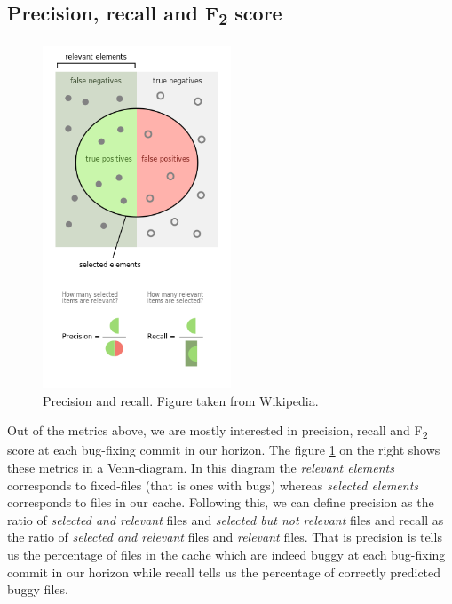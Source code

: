 \documentclass[12pt,twoside,notitlepage]{report}
\begin{document}
\subsection{Precision, recall and F\textsubscript{2} score}
\begin{figure}[ht!]
\includegraphics[width=0.5\textwidth]{Precisionrecall.png}
\centering
 \begin{minipage}{\linewidth}
    \caption[Precision and recall.]%
    {Precision and recall. Figure taken from Wikipedia\footnotemark.}
  \end{minipage}
  \label{precisionrecall}
\end{figure}
Out of the metrics above, we are mostly interested in precision, recall and F\textsubscript{2} score at each bug-fixing commit in our horizon. The figure \ref{precisionrecall} on the right shows these metrics in a Venn-diagram. In this diagram the \textit{relevant elements} corresponds to fixed-files (that is ones with bugs) whereas \textit{selected elements} corresponds to files in our cache. Following this, we can define precision as the ratio of \textit{selected and relevant} files and \textit{selected but not relevant} files and recall as the ratio of \textit{selected and relevant} files and \textit{relevant} files. That is precision is tells us the percentage of files in the cache which are indeed buggy at each bug-fixing commit in our horizon while recall tells us the percentage of correctly predicted buggy files. 
\end{document}
